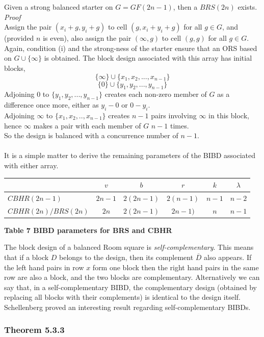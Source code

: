\documentclass[
  12pt,
  a4paper]{book}
\begin{document}
Given a strong balanced starter on \(G=GF(2n-1)\), then a \(BRS(2n)\)
exists.\\
\emph{Proof}\\
Assign the pair \((x_i+g,y_i+g)\) to cell \((g,x_i+y_i+g)\) for all
\(g \in G\), and (provided \(n\) is even), also assign the pair \((\infty,g)\)
to cell \((g,g)\) for all \(g \in G\).\\
Again, condition (i) and the strong-ness of the starter ensure that an
ORS based on \(G \cup \{\infty\}\) is obtained. The block design
associated with this array has initial blocks,
\[\{\infty\} \cup \{x_1,x_2,...,x_{n-1}\}\]
\[\{0\} \cup \{y_1,y_2,...,y_{n-1}\}\] Adjoining 0 to
\(\{y_1,y_2,...,y_{n-1}\}\) creates each non-zero member of \(G\) as a
difference once more, either as \(y_i-0\) or \(0-y_i\).\\
Adjoining \(\infty\) to \(\{x_1,x_2,..,x_{n-1}\}\) creates \(n-1\) pairs
involving \(\infty\) in this block, hence \(\infty\) makes a pair with each
member of \(G\) \(n-1\) times.\\
So the design is balanced with a concurrence number of \(n-1\).\\
~\\
It is a simple matter to derive the remaining parameters of the BIBD
associated with either array.

\begin{longtable}[]{@{}lccccc@{}}
\toprule
& \(v\) & \(b\) & \(r\) & \(k\) & \(\lambda\)\tabularnewline
\midrule
\endhead
\(CBHR(2n-1)\) & \(2n-1\) & \(2(2n-1)\) & \(2(n-1)\) & \(n-1\) & \(n-2\)\tabularnewline
\(CBHR(2n)/BRS(2n)\) & \(2n\) & \(2(2n-1)\) & \(2n-1)\) & \(n\) & \(n-1\)\tabularnewline
\bottomrule
\end{longtable}

\textbf{Table 7 BIBD parameters for BRS and CBHR}

The block design of a balanced Room square is \emph{self-complementary}. This
means that if a block \(D\) belongs to the design, then its complement
\(\overline{D}\) also appears. If the left hand pairs in row \(x\) form one
block then the right hand pairs in the same row are also a block, and
the two blocks are complementary. Alternatively we can say that, in a
self-complementary BIBD, the complementary design (obtained by replacing
all blocks with their complements) is identical to the design itself.\\
Schellenberg proved an interesting result regarding self-complementary
BIBDs.

\hypertarget{theorem-5.3.3}{%
\subsubsection{Theorem 5.3.3}\label{theorem-5.3.3}}
\end{document}

